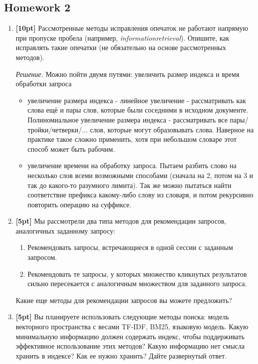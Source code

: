 \subsection*{Homework 2}

\begin{enumerate}
	\item \textbf{[10pt]} Рассмотренные методы исправления опечаток не работают напрямую при 
	пропуске пробела (например, \textit{informationretrieval}). Опишите, как исправлять такие 
	опечатки (не обязательно на основе рассмотренных методов).
	
	\textit{Решение.} Можно пойти двумя путями: увеличить размер индекса и время обработки запроса
	\begin{itemize}
		\item увеличение размера индекса - линейное увеличение - рассматривать как слова ещё и 
		пары слов, которые были соседними в исходном документе. Полиномиальное увеличение размера 
		индекса - рассматривать все пары/тройки/четверки/... слов, которые могут образовывать 
		слова. Наверное на практике такое сложно применить, хотя при небольшом словаре этот 
		способ может быть рабочим.  
		\item увеличение времени на обработку запроса. Пытаем разбить слово на несколько слов 
		всеми возможными способами (сначала на 2, потом на 3 и так до какого-то разумного 
		лимита). Так же можно пытаться найти соответствие префикса какому-либо слову из словаря, 
		и потом рекурсивно повторить операцию на суффиксе.
	\end{itemize}
	
	\item \textbf{[5pt]} Мы рассмотрели два типа методов для рекомендации запросов, аналогичных 
	заданному запросу:
	\begin{enumerate}
		\item Рекомендовать запросы, встречающиеся в одной сессии с заданным запросом.
		\item Рекомендовать те запросы, у которых множество кликнутых результатов сильно 	
		пересекается с аналогичным множеством для заданного запроса.
	\end{enumerate}

	Какие еще методы для рекомендации запросов вы можете предложить?
	
	\item \textbf{[5pt]} Вы планируете использовать следующие методы поиска: модель векторного 
	пространства с весами TF-IDF, BM25, языковую модель. Какую минимальную информацию должен 
	содержать индекс, чтобы поддерживать эффективное использование этих методов? Какую информацию 
	нет смысла хранить в индексе? Как ее нужно хранить? Дайте развернутый ответ.
	

\end{enumerate}
